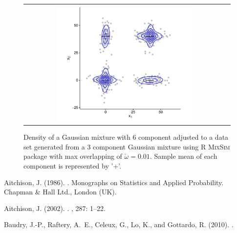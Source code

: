 \documentclass[10pt, a4paper]{article}
\begin{document}
\begin{spacing}{1.9}
\begin{figure}[thbp]
\begin{center}
\begin{tabular}{cc}
  \includegraphics[width=0.7\textwidth]{figures/partition-example-mixture.pdf} \\
 \end{tabular}
 \caption{Density of a Gaussian mixture with 6 component adjusted to a data set generated from a 3 component Gaussian mixture using R \textsc{MixSim} package with max overlapping of $\check{\omega} = 0.01$. Sample mean of each component is represented by '+'.}\label{ex_mixture}
\end{center}
\end{figure}







\newpage


\begin{thebibliography}{}

Aitchison, J. (1986).
.
\newblock Monographs on Statistics and Applied Probability. Chapman \& Hall
  Ltd., London (UK).

Aitchison, J. (2002).
.
, 287: 1--22.

Baudry, J.-P., Raftery, A.~E., Celeux, G., Lo, K., and Gottardo, R. (2010).
.


\end{thebibliography}
\end{spacing}
\end{document}
